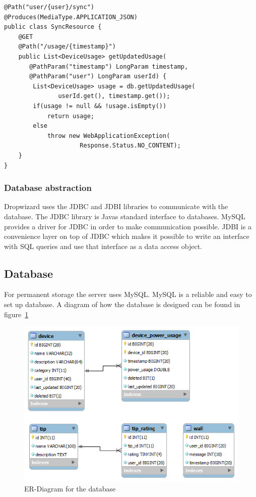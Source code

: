 \noindent\begin{minipage}{\textwidth}
\begin{lstlisting}[caption={Dropwizard resource example}, label={lst:dropwizardResource}]
@Path("user/{user}/sync")
@Produces(MediaType.APPLICATION_JSON)
public class SyncResource {
    @GET
    @Path("/usage/{timestamp}")
    public List<DeviceUsage> getUpdatedUsage(
	   @PathParam("timestamp") LongParam timestamp, 
	   @PathParam("user") LongParam userId) {
        List<DeviceUsage> usage = db.getUpdatedUsage(
		       userId.get(), timestamp.get());
        if(usage != null && !usage.isEmpty())
            return usage;
        else
            throw new WebApplicationException(
			         Response.Status.NO_CONTENT);
    }
}
\end{lstlisting}
\end{minipage}

\subsubsection{Database abstraction}
Dropwizard uses the JDBC and JDBI libraries to communicate with the database. The JDBC library is Javas standard interface to databases. MySQL provides a driver for JDBC in order to make communication possible. JDBI is a convenience layer on top of JDBC which makes it possible to write an interface with SQL queries and use that interface as a data access object.

\subsection{Database}
For permanent storage the server uses MySQL. MySQL is a reliable and easy to set up database. A diagram of how the database is designed can be found in figure~\ref{fig:ER-Diagram}

\begin{figure}[H]
\includegraphics[width=\textwidth]{ch/architecture/fig/ER-Diagram.png}
\caption{ER-Diagram for the database}
\label{fig:ER-Diagram}
\end{figure}
